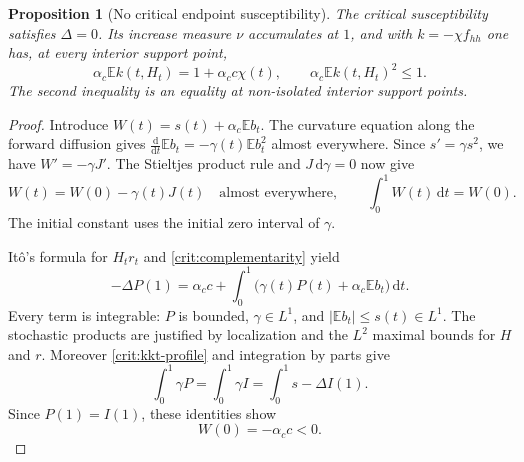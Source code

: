 \documentclass[11pt,a4paper]{article}
\numberwithin{equation}{section}
\newtheorem{proposition}[theorem]{Proposition}
\theoremstyle{definition}
\theoremstyle{remark}
\newcommand{\E}{\mathbb E}
\newcommand{\dd}{\mathrm d}
\begin{document}
\begin{proposition}[No critical endpoint susceptibility]
\label{crit:no-endpoint}
The critical susceptibility satisfies $\Delta=0$.  Its increase measure
$\nu$ accumulates at $1$, and with $k=-\chi f_{hh}$ one has, at every
interior support point,
\begin{equation}\label{eq:src22}
 \alpha_c\E k(t,H_t)=1+\alpha_c c\chi(t),
 \qquad \alpha_c\E k(t,H_t)^2\le1.
\end{equation}
The second inequality is an equality at non-isolated interior support
points.
\end{proposition}

\begin{proof}
Introduce $W(t)=s(t)+\alpha_c\E b_t$.  The curvature equation along
the forward diffusion gives
$\frac{\dd}{\dd t}\E b_t=-\gamma(t)\E b_t^2$ almost everywhere.
Since $s'=\gamma s^2$, we have $W'=-\gamma J'$.
The Stieltjes product rule and $J\,\dd\gamma=0$ now give
\begin{equation}\label{crit:W-identity}
 W(t)=W(0)-\gamma(t)J(t)\quad\text{almost everywhere},
 \qquad \int_0^1W(t)\,\dd t=W(0).
\end{equation}
The initial constant uses the initial zero interval of $\gamma$.

It\^o's formula for $H_tr_t$ and
\eqref{crit:complementarity} yield
\[
 -\Delta P(1)=\alpha_c c
                  +\int_0^1\bigl(\gamma(t)P(t)+\alpha_c\E b_t\bigr)\,\dd t.
\]
Every term is integrable: $P$ is bounded, $\gamma\in L^1$, and
$|\E b_t|\le s(t)\in L^1$.  The stochastic products are justified by
localization and the $L^2$ maximal bounds for $H$ and $r$.
Moreover \eqref{crit:kkt-profile} and integration by parts give
\[
 \int_0^1\gamma P=\int_0^1\gamma I
                   =\int_0^1s-\Delta I(1).
\]
Since $P(1)=I(1)$, these identities show
\begin{equation}\label{crit:W0}
 W(0)=-\alpha_c c<0.
\end{equation}


\end{proof}
\end{document}
